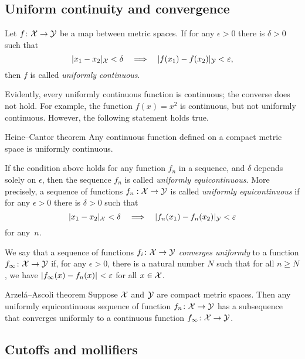 \subsection*{Uniform continuity and convergence}

Let $f\colon{\mathcal{X}}\to \mathcal{Y}$ be a map between metric spaces.
If  for any $\epsilon>0$ there is $\delta>0$ such that 
\[\dist{x_1}{x_2}{\spc{X}}<\delta\quad\Longrightarrow\quad \dist{f(x_1)}{f(x_2)}{\spc{Y}}<\epsilon,\]
then $f$ is called \emph{uniformly continuous}.

Evidently, every uniformly continuous function is continuous;
the converse does not hold.
For example, the function $f(x)=x^2$ is continuous, but not uniformly continuous.
However, the following statement holds true.

\begin{thm}{Heine--Cantor theorem}
Any continuous function defined on a compact metric space is uniformly continuous.
\end{thm}

If the condition above holds for any function $f_n$ in a sequence, and $\delta$ depends solely on $\epsilon$,
then the sequence $f_n$ is called \emph{uniformly equicontinuous}.
More precisely, 
a sequence of functions $f_n:{\mathcal{X}}\to \mathcal{Y}$ is called {}\emph{uniformly equicontinuous} if 
for any $\epsilon>0$ there is $\delta>0$ such that 
\[\dist{x_1}{x_2}{\spc{X}}<\delta\quad\Longrightarrow\quad \dist{f_n(x_1)}{f_n(x_2)}{\spc{Y}}<\epsilon\]
for any~$n$.


We say that a sequence of functions $f_i\colon {\mathcal{X}} \to \mathcal{Y}$ \emph{converges uniformly} to a function $f_{\infty}\colon {\mathcal{X}} \to \mathcal{Y}$ if, for any 
$\epsilon>0$, there is a natural number $N$ such that for all $n \ge N$, we have $\dist{f_{\infty}(x)}{f_n (x)}{}<\epsilon$
for all $x  \in {\mathcal{X}}$.

\begin{thm}{Arzel\'{a}--Ascoli theorem}\label{lem:equicontinuous}
Suppose $\mathcal{X}$ and $\mathcal{Y}$ are compact metric spaces. 
Then any uniformly equicontinuous sequence of function $f_n\:\spc{X}\z\to \spc{Y}$ has a subsequence that converges uniformly to a continuous function $f_\infty\colon\mathcal{X}\to \mathcal{Y}$. 
\end{thm}

\subsection*{Cutoffs and mollifiers}

